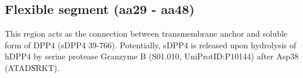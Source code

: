 \subsection{Flexible segment (aa29 - aa48)}

This region acts as the connection between transmembrane anchor and soluble form of DPP4 (sDPP4 39-766). Potentially, sDPP4 is released upon hydrolysis of hDPP4 by serine protease Granzyme B (S01.010, UniProtID:P10144) after Asp38 (ATAD\|SRKT).~\cite{Song_2018} 
